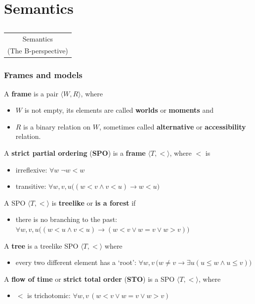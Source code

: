 \documentclass[xcolor=x11names]{beamer}
\makeatletter
\let\beamer@writeslidentry@miniframeson=\beamer@writeslidentry
\def\beamer@writeslidentry@miniframesoff{%
  \expandafter\beamer@ifempty\expandafter{\beamer@framestartpage}{}%
  {%
    \clearpage\beamer@notesactions%
  }
}
\newcommand*{\miniframeson}{\let\beamer@writeslidentry=\beamer@writeslidentry@miniframeson}
\newcommand*{\miniframesoff}{\let\beamer@writeslidentry=\beamer@writeslidentry@miniframesoff}
\newcommand{\cimdia}[1] {\miniframesoff \begin{frame}\begin{center}\huge \begin{tabular}{c}#1\end{tabular}\end{center}\end{frame}\miniframeson}
\newcommand{\szakasz}[2][]{\section{#1}\subsection{}\cimdia{#2}}
\renewcommand{\emph}[1]{\textbf{#1}}
\newcommand{\lthen}{\rightarrow}
\makeatother
\begin{document}
\szakasz[Semantics]{Semantics\\[2em] (The B-perspective)}

\begin{frame}
	\frametitle{Frames and models}
\footnotesize

A \emph{frame} is a pair $\langle W, R\rangle$, where
\begin{itemize}
\item $W$ is not empty, its elements are called \emph{worlds} or \emph{moments} and
\item $R$ is a binary relation on $W$, sometimes called \emph{alternative} or \emph{accessibility} relation.
\end{itemize}

\bigskip

A \emph{strict partial ordering} (\emph{SPO}) is a \emph{frame} $\langle T, <\rangle$, where $<$ is

\begin{itemize}
 \item irreflexive: $\forall w \;\lnot w<w$
 \item transitive:  $\forall w,v,u \big((w<v \land v<u)\lthen w<u\big)$
\end{itemize}

\bigskip

A SPO $\langle T, <\rangle$ is \emph{treelike} or \emph{is a forest} if
\begin{itemize}
 \item there is no branching to the past: $\forall w, v, u\big( (w<u \land v<u) \lthen (w<v \lor w=v \lor w>v)\big) $
\end{itemize}

\bigskip

A \emph{tree} is a treelike SPO $\langle T, <\rangle$ where
\begin{itemize}
 \item every two different element has a `root': $\forall w, v \, \big(w\neq v \lthen \exists u( u \leq w \land u\leq v)\big) $
\end{itemize}

\bigskip

A \emph{flow of time} or \emph{strict total order} (\emph{STO}) is a {SPO} $\langle T, <\rangle$, where
\begin{itemize}
 \item $<$ is trichotomic: $\forall w,v \,(w<v \lor w=v \lor w>v)$
\end{itemize}


\end{frame}
\end{document}
